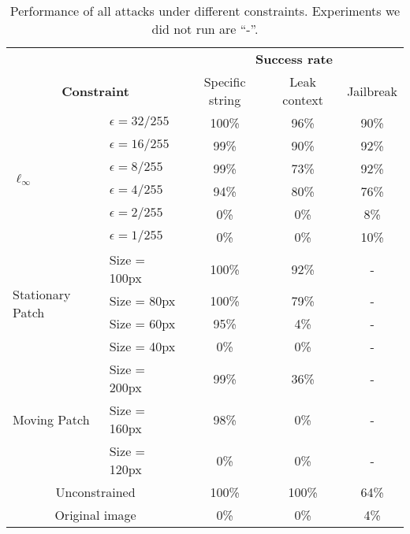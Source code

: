 \begin{table}[!ht]
    \centering
    \caption{Performance of all attacks under different constraints. Experiments we did not run are ``-''.} %

    \begin{tabular}{p{2cm}lccc}
        \toprule
        & & \multicolumn{3}{c}{\textbf{Success rate}} \\
        \cmidrule(r){3-5}
        \multicolumn{2}{c}{\textbf{Constraint}} & \multicolumn{1}{p{2cm}}{\centering Specific string} & \multicolumn{1}{p{2cm}}{\centering Leak context} & \multicolumn{1}{p{2cm}}{\centering Jailbreak} \\
        \cmidrule(r){1-2}\cmidrule{3-5}
        \multirow{6}{=}{\parbox{2cm}{\centering $\ell_\infty$}} 
         & $\epsilon = 32/255$ & \hphantom{}100\% & \hphantom{0}96\% & \hphantom{0}90\% \\
         & $\epsilon = 16/255$ & \hphantom{0}99\% & \hphantom{0}90\% & \hphantom{0}92\% \\
         & $\epsilon = 8/255$  & \hphantom{0}99\% & \hphantom{0}73\% & \hphantom{0}92\%\\
         & $\epsilon = 4/255$  & \hphantom{0}94\% & \hphantom{0}80\% & \hphantom{0}76\%\\
         & $\epsilon = 2/255$  & \hphantom{00}0\% & \hphantom{00}0\% & \hphantom{00}8\%\\
         & $\epsilon = 1/255$  & \hphantom{00}0\% & \hphantom{00}0\% & \hphantom{0}10\%\\
        \cmidrule(r){1-2}\cmidrule{3-5}
        \multirow{4}{=}{\parbox{2cm}{\centering Stationary Patch}} 
         & Size = 100px & \hphantom{}100\% & \hphantom{0}92\% & -\\
         & Size = 80px  & \hphantom{}100\% & \hphantom{0}79\% & -\\
         & Size = 60px  & \hphantom{0}95\% & \hphantom{00}4\% & -\\
         & Size = 40px  & \hphantom{00}0\% & \hphantom{00}0\% & - \\
        \cmidrule(r){1-2}\cmidrule{3-5}
        \multirow{3}{=}{\parbox{2cm}{\centering Moving Patch}} 
         & Size = 200px & \hphantom{0}99\% & \hphantom{0}36\% & - \\
         & Size = 160px & \hphantom{0}98\% & \hphantom{00}0\% & - \\
         & Size = 120px & \hphantom{00}0\% & \hphantom{00}0\% & - \\
        \cmidrule(r){1-2}\cmidrule{3-5}
        \multicolumn{2}{c}{Unconstrained} & 100\% & 100\% & \hphantom{0}64\% \\
        \cmidrule(r){1-2}\cmidrule{3-5}
        \multicolumn{2}{c}{Original image} & \hphantom{00}0\% & \hphantom{00}0\% & \hphantom{00}4\% \\
        \bottomrule
    \end{tabular}
    \label{tab:merged}
\end{table}